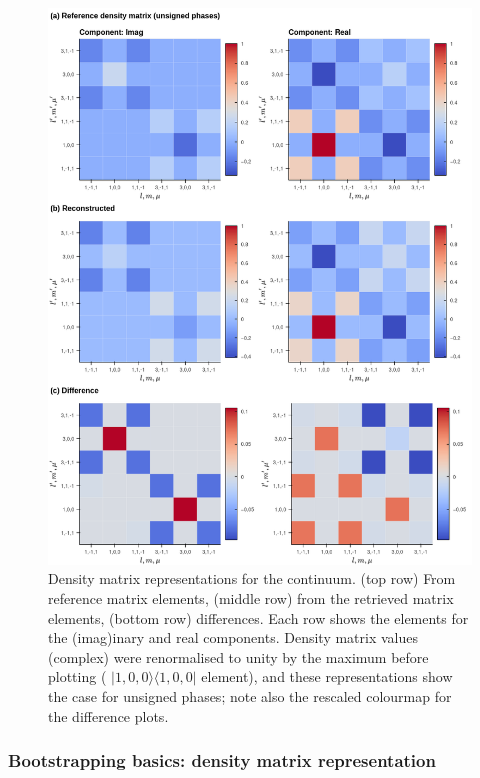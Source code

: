 \documentclass[10pt]{article}
\begin{document}
\begin{figure}[]
\begin{center}
\includegraphics[width=\textwidth,height=\dimexpr\textheight-4\baselineskip-\abovecaptionskip-\belowcaptionskip\relax,keepaspectratio]{figures/dataDump_1000fitTests_multiFit_noise_051021_densityNorm_max_090323_19-42-31.png}
\caption{Density matrix representations for the continuum. (top row) From reference matrix elements, (middle row) from the retrieved matrix elements, (bottom row) differences. Each row shows the elements for the (imag)inary and real components. Density matrix values (complex) were renormalised to unity by the maximum before plotting ( \(|1,0,0\rangle \langle1,0,0|\) element), and these representations show the case for unsigned phases; note also the rescaled colourmap for the difference plots.\label{998904}}
\end{center}
\end{figure}

\subsubsection{Bootstrapping basics: density matrix representation\label{sec:den-mat-N2}}
\end{document}
